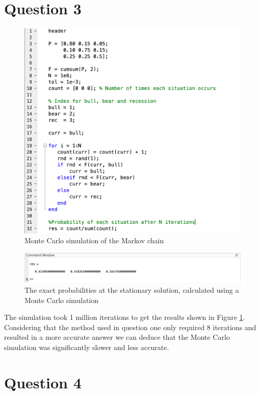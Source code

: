 \documentclass{article}
\begin{document}
\section{Question 3}
\begin{figure}[H]
    \includegraphics[width=\linewidth]{./imgs/3.png}
    \caption{Monte Carlo simulation of the Markov chain}
\end{figure}
\begin{figure}[H]
    \includegraphics[width=\linewidth]{./imgs/3ans.png}
    \caption{The exact probabilities at the stationary solution, calculated using a Monte Carlo simulation}
    \label{fig:3ans}
\end{figure}
The simulation took 1 million iterations to get the results shown in Figure \ref{fig:3ans}. Considering that the method used in question one only required 8 iterations and resulted in a more accurate answer we can deduce that the Monte Carlo simulation was significantly slower and less accurate.





\section{Question 4}
\end{document}
